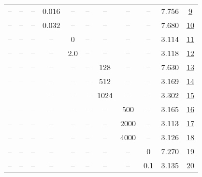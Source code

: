 \begin{table}[H]
\begin{tabular}{ccccccccccc}
-- & -- & -- & 0.016 & -- & -- & -- & -- & -- & 7.756 & \href{https://wandb.ai/stanford-mercury/optimizer-scaling/runs/sweep-520m-10B-adamwd13956lr0.016-wd0.2-minlr0-warmup1000-b10.9--db0248}{9} \\
-- & -- & -- & 0.032 & -- & -- & -- & -- & -- & 7.680 & \href{https://wandb.ai/stanford-mercury/optimizer-scaling/runs/sweep-520m-10B-adamwd5cf15lr0.032-wd0.2-minlr0-warmup1000-b10.9--ef01e7}{10} \\
-- & -- & -- & -- & 0 & -- & -- & -- & -- & 3.114 & \href{https://wandb.ai/stanford-mercury/optimizer-scaling/runs/sweep-520m-10B-adamw83ff1flr0.004-wd0.2-minlr0-warmup1000-b10.9--2b2992}{11} \\
-- & -- & -- & -- & 2.0 & -- & -- & -- & -- & 3.118 & \href{https://wandb.ai/stanford-mercury/optimizer-scaling/runs/sweep-520m-10B-adamwc35658lr0.004-wd0.2-minlr0-warmup1000-b10.9--e10d12}{12} \\
-- & -- & -- & -- & -- & -- & 128 & -- & -- & 7.630 & \href{https://wandb.ai/stanford-mercury/optimizer-scaling/runs/sweep-520m-10B-adamw9d215dlr0.004-wd0.2-minlr0-warmup1000-b10.9--0e6642}{13} \\
-- & -- & -- & -- & -- & -- & 512 & -- & -- & 3.169 & \href{https://wandb.ai/stanford-mercury/optimizer-scaling/runs/sweep-520m-10B-adamwa3b31flr0.004-wd0.2-minlr0-warmup1000-b10.9--3d3c5b}{14} \\
-- & -- & -- & -- & -- & -- & 1024 & -- & -- & 3.302 & \href{https://wandb.ai/stanford-mercury/optimizer-scaling/runs/sweep-520m-10B-adamwa78593lr0.004-wd0.2-minlr0-warmup1000-b10.9--f6c234}{15} \\
-- & -- & -- & -- & -- & -- & -- & 500 & -- & 3.165 & \href{https://wandb.ai/stanford-mercury/optimizer-scaling/runs/sweep-520m-10B-adamwfa4107lr0.004-wd0.2-minlr0-warmup500-b10.9-b-da6d10}{16} \\
-- & -- & -- & -- & -- & -- & -- & 2000 & -- & 3.113 & \href{https://wandb.ai/stanford-mercury/optimizer-scaling/runs/sweep-520m-10B-adamw78783dlr0.004-wd0.2-minlr0-warmup2000-b10.9--07b41c}{17} \\
-- & -- & -- & -- & -- & -- & -- & 4000 & -- & 3.126 & \href{https://wandb.ai/stanford-mercury/optimizer-scaling/runs/sweep-520m-10B-adamw27eccflr0.004-wd0.2-minlr0-warmup4000-b10.9--46c4f0}{18} \\
-- & -- & -- & -- & -- & -- & -- & -- & 0 & 7.270 & \href{https://wandb.ai/stanford-mercury/optimizer-scaling/runs/sweep-520m-10B-adamw25a778lr0.004-wd0-minlr0-warmup1000-b10.9-b2-f5ae68}{19} \\
-- & -- & -- & -- & -- & -- & -- & -- & 0.1 & 3.135 & \href{https://wandb.ai/stanford-mercury/optimizer-scaling/runs/sweep-520m-10B-adamw1872fclr0.004-wd0.1-minlr0-warmup1000-b10.9--34d388}{20} \\
\bottomrule
\end{tabular}
\end{table}


